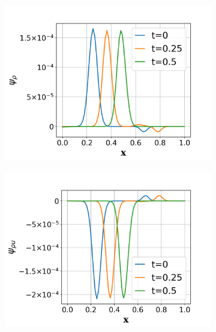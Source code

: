 \documentclass[a4paper]{article}
\begin{document}
\begin{figure}
  \centering
  \begin{subfigure}{0.475\textwidth}
    \includegraphics[width=1.0\linewidth]{figures/psi_rho.png}
    \label{fig:psi_rho}
  \end{subfigure}
  \begin{subfigure}{0.475\textwidth}
    \includegraphics[width=1.0\linewidth]{figures/psi_rhou.png}
    \label{fig:psi_rhou}
  \end{subfigure}
  \begin{subfigure}{0.475\textwidth}

\end{subfigure}
\end{figure}
\end{document}

